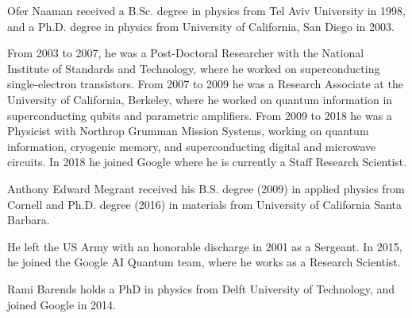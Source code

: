 \documentclass[journal]{IEEEtran}
\begin{document}
\begin{IEEEbiography}{Ofer Naaman} received a B.Sc. degree in physics from Tel Aviv University in 1998, and a Ph.D. degree in physics from University of California, San Diego in 2003. 

From 2003 to 2007, he was a Post-Doctoral Researcher with the National Institute of Standards and Technology, where he worked on superconducting single-electron transistors. From 2007 to 2009 he was a Research Associate at the University of California, Berkeley, where he worked on quantum information in superconducting qubits and parametric amplifiers. From 2009 to 2018 he was a Physicist with Northrop Grumman Mission Systems, working on quantum information, cryogenic memory, and superconducting digital and microwave circuits. In 2018 he joined Google where he is currently a Staff Research Scientist.
\end{IEEEbiography}\vfill
\begin{IEEEbiography}{Anthony Edward Megrant} received his B.S. degree (2009) in applied physics from Cornell and Ph.D. degree (2016) in materials from University of California Santa Barbara.  

He left the US Army with an honorable discharge in 2001 as a Sergeant.  In 2015, he joined the Google AI Quantum team, where he works as a Research Scientist. 
\end{IEEEbiography}\vfill
\begin{IEEEbiographynophoto}{Rami Barends} holds a PhD in physics from Delft University of Technology, and joined Google in 2014.\end{IEEEbiographynophoto}\vfill
\end{document}
